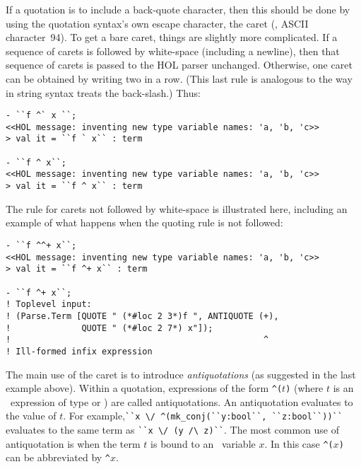 If a quotation is to include a back-quote character, then this should
be done by using the quotation syntax's own escape character, the
caret (\ml{\^}, ASCII character~94).  To get a bare caret, things are
slightly more complicated.  If a sequence of carets is followed by
white-space (including a newline), then that sequence of carets is
passed to the HOL parser unchanged.  Otherwise, one caret can be
obtained by writing two in a row. (This last rule is analogous to the
way in \ML{} string syntax treats the back-slash.) Thus:
\begin{session}
\begin{verbatim}
- ``f ^` x ``;
<<HOL message: inventing new type variable names: 'a, 'b, 'c>>
> val it = ``f ` x`` : term

- ``f ^ x``;
<<HOL message: inventing new type variable names: 'a, 'b, 'c>>
> val it = ``f ^ x`` : term
\end{verbatim}
\end{session}

The rule for carets not followed by white-space is illustrated here,
including an example of what happens when the quoting rule is not
followed:
\begin{session}
\begin{verbatim}
- ``f ^^+ x``;
<<HOL message: inventing new type variable names: 'a, 'b, 'c>>
> val it = ``f ^+ x`` : term

- ``f ^+ x``;
! Toplevel input:
! (Parse.Term [QUOTE " (*#loc 2 3*)f ", ANTIQUOTE (+),
!              QUOTE " (*#loc 2 7*) x"]);
!                                                  ^
! Ill-formed infix expression
\end{verbatim}
\end{session}

The main use of the caret is to introduce \emph{antiquotations} (as
suggested in the last example above).  Within a quotation, expressions
of the form {\small\verb+^(+}$t${\small\verb+)+}
%
%
(where $t$ is an \ML\ expression of type
%
%
 or ) are called antiquotations.
%
%
%
%
An antiquotation  evaluates to the
\ML{} value of $t$. For example,{\small\verb+``x \/ ^(mk_conj(``y:bool``, ``z:bool``))``+}
evaluates to the same term as {\small\verb+``x \/ (y /\ z)``+}. The
most common use of antiquotation is when the term $t$ is bound to an \ML\
variable $x$. In this case {\small\verb+^(+}$x${\small\verb+)+} can be
abbreviated by {\small\verb+^+}$x$.

